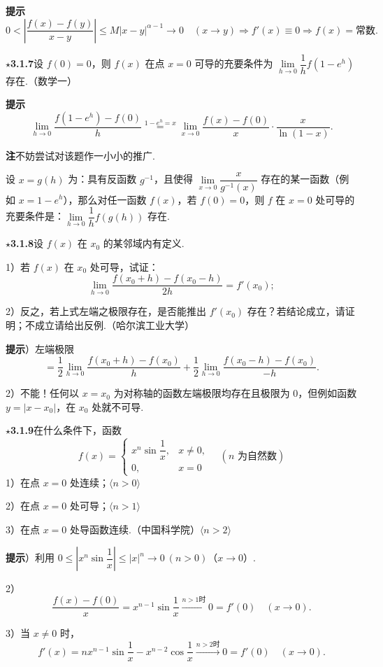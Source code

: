 \documentclass[UTF8,12pt,a4paper,fontset=fandol]{ctexart}
\begin{document}
\noindent\textbf{提示}\quad
\[
  0<\left|\frac{f(x)-f(y)}{x-y}\right|
  \le M|x-y|^{\alpha-1}\to0\quad(x\to y)\Rightarrow f'(x)\equiv0\Rightarrow f(x)=\text{常数}.
\]

\noindent\textbf{$\star$3.1.7}\quad 设 $f(0)=0$，则 $f(x)$ 在点 $x=0$ 可导的充要条件为 $\lim\limits_{h\to0}\dfrac1h f(1-e^h)$ 存在.（数学一）

\noindent\textbf{提示}\quad
\[
  \lim_{h\to0}\frac{f(1-e^h)-f(0)}h
  \stackrel{1-e^h=x}{=}\lim_{x\to0}\frac{f(x)-f(0)}x\cdot\frac{x}{\ln(1-x)}.
\]

\noindent\textbf{注}\quad 不妨尝试对该题作一小小的推广.

设 $x=g(h)$ 为：具有反函数 $g^{-1}$，且使得 $\lim\limits_{x\to0}\dfrac{x}{g^{-1}(x)}$ 存在的某一函数（例如 $x=1-e^h$），那么对任一函数 $f(x)$，若 $f(0)=0$，则 $f$ 在 $x=0$ 处可导的充要条件是：$\lim\limits_{h\to0}\dfrac1h f(g(h))$ 存在.

\noindent\textbf{$\star$3.1.8}\quad 设 $f(x)$ 在 $x_0$ 的某邻域内有定义.

1）若 $f(x)$ 在 $x_0$ 处可导，试证：
\[
  \lim_{h\to0}\frac{f(x_0+h)-f(x_0-h)}{2h}=f'(x_0);
\]

2）反之，若上式左端之极限存在，是否能推出 $f'(x_0)$ 存在？若结论成立，请证明；不成立请给出反例.（哈尔滨工业大学）

\noindent\textbf{提示}）左端极限
\[
=\frac12\lim_{h\to0}\frac{f(x_0+h)-f(x_0)}h
+\frac12\lim_{h\to0}\frac{f(x_0-h)-f(x_0)}{-h}.
\]

2）不能！任何以 $x=x_0$ 为对称轴的函数左端极限均存在且极限为 0，但例如函数 $y=|x-x_0|$，在 $x_0$ 处就不可导.

\noindent\textbf{$\star$3.1.9}\quad 在什么条件下，函数
\[
f(x)=
\begin{cases}
x^n\sin\dfrac1x, & x\ne0,\\
0, & x=0
\end{cases}
\quad(n\text{ 为自然数})
\]
1）在点 $x=0$ 处连续；\quad $\langle n>0\rangle$

2）在点 $x=0$ 处可导；\quad $\langle n>1\rangle$

3）在点 $x=0$ 处导函数连续.（中国科学院）\quad $\langle n>2\rangle$

\noindent\textbf{提示}）利用 $0\le\left|x^n\sin\dfrac1x\right|\le|x|^n\to0\ (n>0)$（$x\to0$）.

2）
\[
  \frac{f(x)-f(0)}x=x^{n-1}\sin\frac1x\stackrel{n>1\text{时}}{\longrightarrow}0=f'(0)\quad(x\to0).
\]

3）当 $x\ne0$ 时，
\[
  f'(x)=nx^{n-1}\sin\frac1x-x^{n-2}\cos\frac1x
  \stackrel{n>2\text{时}}{\longrightarrow}0=f'(0)\quad(x\to0).
\]
\end{document}
